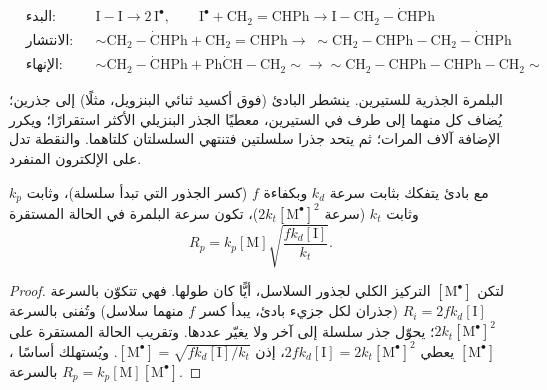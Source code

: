 \begin{omfigure}
\begin{align*}
&\text{البدء:} && \mathrm{I{-}I} \longrightarrow 2\,\mathrm{I^{\bullet}}, \qquad
\mathrm{I^{\bullet} + CH_2{=}CHPh \longrightarrow I{-}CH_2{-}\dot{C}HPh} \\
&\text{الانتشار:} && {\sim}\mathrm{CH_2{-}\dot{C}HPh + CH_2{=}CHPh \longrightarrow}\;
{\sim}\mathrm{CH_2{-}CHPh{-}CH_2{-}\dot{C}HPh} \\
&\text{الإنهاء:} && {\sim}\mathrm{CH_2{-}\dot{C}HPh + Ph\dot{C}H{-}CH_2}{\sim} \longrightarrow
{\sim}\mathrm{CH_2{-}CHPh{-}CHPh{-}CH_2}{\sim}
\end{align*}

{\small البلمرة الجذرية للستيرين. ينشطر البادئ  (فوق أكسيد ثنائي البنزويل، مثلًا)
إلى جذرين؛ يُضاف كل منهما إلى طرف  في الستيرين، معطيًا الجذر البنزيلي
الأكثر استقرارًا؛ ويكرر  الإضافة آلاف المرات؛ ثم يتحد جذرا سلسلتين فتنتهي
السلسلتان كلتاهما. والنقطة تدل على الإلكترون المنفرد.}
\end{omfigure}

\begin{theorem}\label{thm:b2:polymer-synthesis:radical-rate}
مع بادئ يتفكك بثابت سرعة $k_d$ وبكفاءة $f$ (كسر الجذور التي
تبدأ سلسلة)، وثابت  $k_p$ وثابت  $k_t$ (سرعة  $2k_t
[\mathrm{M^\bullet}]^2$)، تكون سرعة البلمرة في الحالة المستقرة
\begin{equation*}
R_p = k_p [\mathrm M] \sqrt{\frac{f k_d [\mathrm I]}{k_t}}.
\end{equation*}
\end{theorem}

\begin{proof}
لتكن $[\mathrm{M^\bullet}]$ التركيز الكلي لجذور السلاسل، أيًّا كان طولها. فهي
تتكوّن بالسرعة $R_i = 2fk_d[\mathrm I]$ (جذران لكل جزيء بادئ، يبدأ كسر $f$
منهما سلاسل) وتُفنى بالسرعة $2k_t[\mathrm{M^\bullet}]^2$؛  يحوّل جذر سلسلة
إلى آخر ولا يغيّر عددها. وتقريب الحالة المستقرة على
$[\mathrm{M^\bullet}]$ يعطي $2fk_d[\mathrm I] = 2k_t[\mathrm{M^\bullet}]^2$، إذن $[\mathrm{M^\bullet}] =
\sqrt{fk_d[\mathrm I]/k_t}$. ويُستهلك  أساسًا ، بالسرعة $R_p =
k_p[\mathrm M][\mathrm{M^\bullet}]$.
\end{proof}

